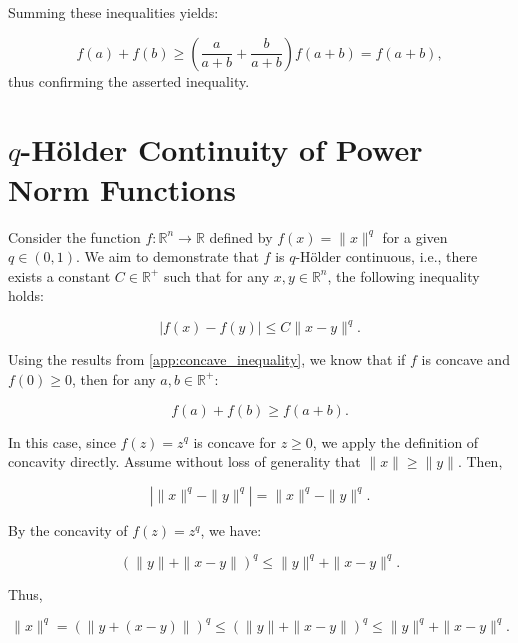 Summing these inequalities yields:

\begin{equation}
f(a) + f(b) \geq \left( \frac{a}{a+b} + \frac{b}{a+b} \right)f(a+b) = f(a+b),
\label{eq:concave_inequality}
\end{equation}
thus confirming the asserted inequality.



\section{\texorpdfstring{\( q \)-Hölder Continuity of Power Norm Functions}{q-Hölder Continuity of Power Norm Functions}}
\label{app:q_holder_proof}

Consider the function \( f : \mathbb{R}^n \rightarrow \mathbb{R} \) defined by \( f(x) = \| x \|^q \) for a given \( q \in (0,1) \). We aim to demonstrate that \( f \) is \( q \)-Hölder continuous, i.e., there exists a constant \( C \in \mathbb{R}^+ \) such that for any \( x, y \in \mathbb{R}^n \), the following inequality holds:

\begin{equation}
\left| f(x) - f(y) \right| \leq C \| x - y \|^q.
\end{equation}

Using the results from \ref{app:concave_inequality}, we know that if \( f \) is concave and \( f(0) \geq 0 \), then for any \( a, b \in \mathbb{R}^+ \):

\begin{equation*}
f(a) + f(b) \geq f(a + b).
\end{equation*}

In this case, since \( f(z) = z^q \) is concave for \( z \geq 0 \), we apply the definition of concavity directly. Assume without loss of generality that \( \| x \| \geq \| y \| \). Then,

\begin{equation*}
\left| \| x \|^q - \| y \|^q \right| = \| x \|^q - \| y \|^q.
\end{equation*}

By the concavity of \( f(z) = z^q \), we have:

\begin{equation*}
\left( \| y \| + \| x - y \| \right)^q \leq \| y \|^q + \| x - y \|^q.
\end{equation*}

Thus,

\begin{equation*}
\| x \|^q = \left( \| y + (x - y) \| \right)^q \leq \left( \| y \| + \| x - y \| \right)^q \leq \| y \|^q + \| x - y \|^q.
\end{equation*}

